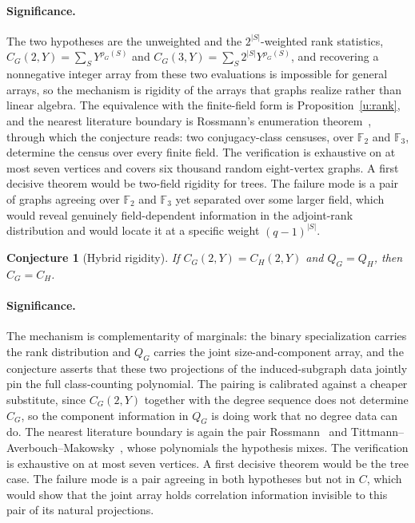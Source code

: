 \documentclass[11pt]{article}
\newtheorem{conjecture}{Conjecture}
\theoremstyle{definition}
\newcommand{\Fq}{\mathbb F}
\begin{document}
\paragraph{Significance.}
The two hypotheses are the unweighted and the $2^{|S|}$-weighted rank statistics, $C_G(2,Y)=\sum_SY^{\rho_G(S)}$ and $C_G(3,Y)=\sum_S2^{|S|}Y^{\rho_G(S)}$, and recovering a nonnegative integer array from these two evaluations is impossible for general arrays, so the mechanism is rigidity of the arrays that graphs realize rather than linear algebra.  The equivalence with the finite-field form is Proposition~\ref{u:rank}, and the nearest literature boundary is Rossmann's enumeration theorem~\cite{Ros22}, through which the conjecture reads: two conjugacy-class censuses, over $\Fq_2$ and $\Fq_3$, determine the census over every finite field.  The verification is exhaustive on at most seven vertices and covers six thousand random eight-vertex graphs.  A first decisive theorem would be two-field rigidity for trees.  The failure mode is a pair of graphs agreeing over $\Fq_2$ and $\Fq_3$ yet separated over some larger field, which would reveal genuinely field-dependent information in the adjoint-rank distribution and would locate it at a specific weight $(q-1)^{|S|}$.


\begin{conjecture}[Hybrid rigidity]\label{u4}
If $C_G(2,Y)=C_H(2,Y)$ and $Q_G=Q_H$, then $C_G=C_H$.
\end{conjecture}

\paragraph{Significance.}
The mechanism is complementarity of marginals: the binary specialization carries the rank distribution and $Q_G$ carries the joint size-and-component array, and the conjecture asserts that these two projections of the induced-subgraph data jointly pin the full class-counting polynomial.  The pairing is calibrated against a cheaper substitute, since $C_G(2,Y)$ together with the degree sequence does not determine $C_G$, so the component information in $Q_G$ is doing work that no degree data can do.  The nearest literature boundary is again the pair Rossmann~\cite{Ros22} and Tittmann--Averbouch--Makowsky~\cite{TAM11}, whose polynomials the hypothesis mixes.  The verification is exhaustive on at most seven vertices.  A first decisive theorem would be the tree case.  The failure mode is a pair agreeing in both hypotheses but not in $C$, which would show that the joint array holds correlation information invisible to this pair of its natural projections.
\end{document}
